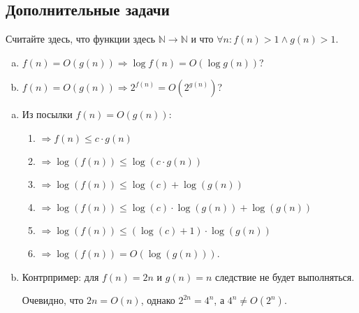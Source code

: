 \subsection*{Дополнительные задачи}

\begin{problem}
    Считайте здесь, что функции здесь $\mathbb{N} \to \mathbb{N}$ и что $\forall n : f(n) > 1 \land g(n) > 1$.
    \begin{enumerate}[(a)]
        \item $f(n) = O(g(n)) \Rightarrow \log f(n) = O(\log g(n))$?
        \item $f(n) = O(g(n)) \Rightarrow 2^{f(n)} = O(2^{g(n)})$?
    \end{enumerate}
\end{problem}

\begin{solution}
    \leavevmode\vspace{1pt}

    \begin{enumerate}[(a)]
        \item Из посылки $f(n) = O(g(n))$:
            \begin{enumerate}[1.]
                \item $\Rightarrow f(n) \le c \cdot g(n)$
                \item $\Rightarrow \log(f(n)) \le \log(c \cdot g(n))$
                \item $\Rightarrow \log(f(n)) \le \log(c) + \log(g(n))$
                \item $\Rightarrow \log(f(n)) \le \log(c) \cdot \log(g(n)) + \log(g(n))$
                \item $\Rightarrow \log(f(n)) \le (\log(c) + 1) \cdot \log(g(n))$
                \item $\Rightarrow \log(f(n)) = O(\log(g(n)))$.
                \qedsymbol
            \end{enumerate}

        \item Контрпример: для $f(n) = 2n$ и $g(n) = n$ следствие не будет выполняться.

            Очевидно, что $2n = O(n)$, однако $2^{2n} = 4^{n}$, а $4^{n} \neq O(2^{n})$.
    \end{enumerate}
\end{solution}


